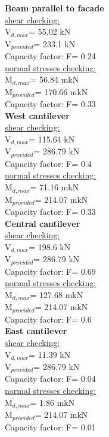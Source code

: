 \textbf{Beam parallel to facade} \\
\underline{shear checking:} \\
V$_{d,max}$=  55.02  kN \\ V$_{provided}$=  233.1  kN \\ Capacity factor: F=  0.24  \\
\underline{normal stresses checking:} \\
M$_{d,max}$=  56.84  mkN \\ M$_{provided}$=  170.66  mkN \\ Capacity factor: F=  0.33  \\


\textbf{West cantilever} \\
\underline{shear checking:} \\
V$_{d,max}$=  115.64  kN \\ V$_{provided}$=  286.79  kN \\ Capacity factor: F=  0.4  \\
\underline{normal stresses checking:} \\
M$_{d,max}$=  71.16  mkN \\ M$_{provided}$=  214.07  mkN \\ Capacity factor: F=  0.33  \\


\textbf{Central cantilever} \\
\underline{shear checking:} \\
V$_{d,max}$=  198.6  kN \\ V$_{provided}$=  286.79  kN \\ Capacity factor: F=  0.69  \\
\underline{normal stresses checking:} \\
M$_{d,max}$=  127.68  mkN \\ M$_{provided}$=  214.07  mkN \\ Capacity factor: F=  0.6  \\


\textbf{East cantilever} \\
\underline{shear checking:} \\
V$_{d,max}$=  11.39  kN \\ V$_{provided}$=  286.79  kN \\ Capacity factor: F=  0.04  \\
\underline{normal stresses checking:} \\
M$_{d,max}$=  1.86  mkN \\ M$_{provided}$=  214.07  mkN \\ Capacity factor: F=  0.01  \\


